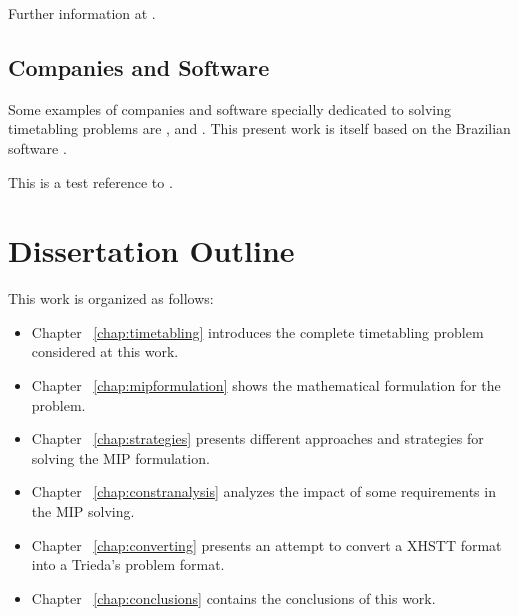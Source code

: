 Further information at \cite{Mista}.


\subsection{Companies and Software}
\label{companies}

Some examples of companies and software specially dedicated to solving timetabling problems are \cite{Mimosasoftware}, \cite{Eventmap} and \cite{Unitime}. This present work is itself based on the Brazilian software \cite{Trieda}.



This is a test reference to \cite{DSS}.           %





\section{Dissertation Outline}
This work is organized as follows: 
\begin{itemize}
	\item Chapter ~\ref{chap:timetabling} introduces the complete timetabling problem considered at this work.
	\item Chapter ~\ref{chap:mipformulation} shows the mathematical formulation for the problem.
	\item Chapter ~\ref{chap:strategies} presents different approaches and strategies for solving the MIP formulation.
	\item Chapter ~\ref{chap:constranalysis} analyzes the impact of some requirements in the MIP solving.
	\item Chapter ~\ref{chap:converting} presents an attempt to convert a XHSTT format into a Trieda's problem format.
	\item Chapter ~\ref{chap:conclusions} contains the conclusions of this work.
\end{itemize}